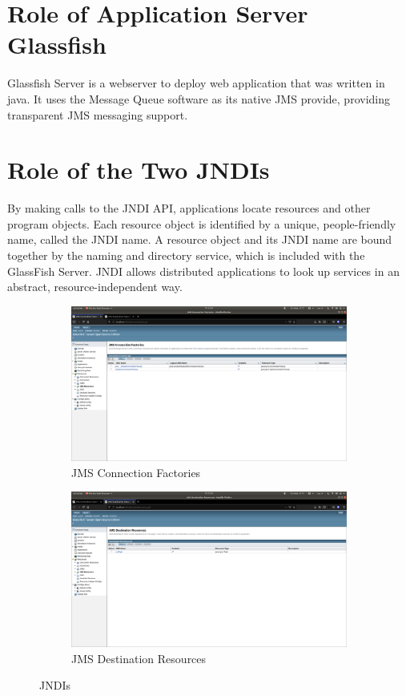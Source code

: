 \documentclass[11pt,a4paper]{report}
\begin{document}
	\section{Role of Application Server Glassfish}
	\label{sec:glassfish}
	Glassfish Server is a webserver to deploy web application that was written in java. It uses the Message Queue software as its native JMS provide, providing transparent JMS messaging support.
	\section{Role of the Two JNDIs}
	\label{sec:jndi}
	By making calls to the JNDI API, applications locate resources and other program objects. Each resource object is identified by a unique, people-friendly name, called the JNDI name. A resource object and its JNDI name are bound together by the naming and directory service, which is included with the GlassFish Server. JNDI allows distributed applications to look up services in an abstract, resource-independent way.
	\begin{figure}[h!]
		\centering
  		\begin{subfigure}[b]{0.4\linewidth}
  		\includegraphics[width=\linewidth]{jndi1.png}
    		\caption{JMS Connection Factories}
  		\end{subfigure}
  		\begin{subfigure}[b]{0.4\linewidth}
    		\includegraphics[width=\linewidth]{jndi2.png}
    		\caption{JMS Destination Resources}
  		\end{subfigure}
  		\caption{JNDIs}
  		\label{fig:jndi}
	\end{figure}
\end{document}
